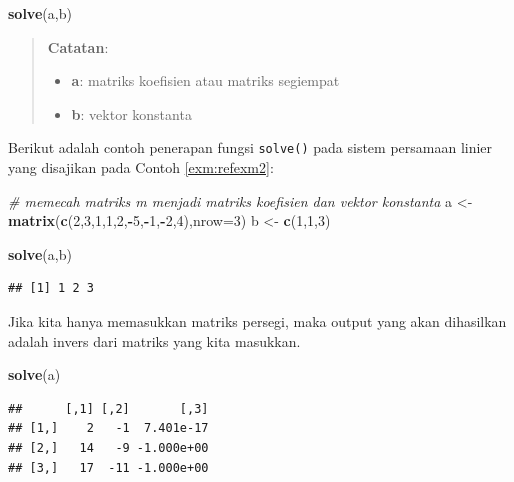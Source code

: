 \documentclass[]{book}
\newenvironment{Shaded}{\begin{snugshade}}{\end{snugshade}}
\newcommand{\CommentTok}[1]{\textcolor[rgb]{0.56,0.35,0.01}{\textit{#1}}}
\newcommand{\DataTypeTok}[1]{\textcolor[rgb]{0.13,0.29,0.53}{#1}}
\newcommand{\DecValTok}[1]{\textcolor[rgb]{0.00,0.00,0.81}{#1}}
\newcommand{\KeywordTok}[1]{\textcolor[rgb]{0.13,0.29,0.53}{\textbf{#1}}}
\newcommand{\NormalTok}[1]{#1}
\newcommand{\OperatorTok}[1]{\textcolor[rgb]{0.81,0.36,0.00}{\textbf{#1}}}
\newcommand{\StringTok}[1]{\textcolor[rgb]{0.31,0.60,0.02}{#1}}
\providecommand{\tightlist}{%
  \setlength{\itemsep}{0pt}\setlength{\parskip}{0pt}}
\theoremstyle{definition}
\theoremstyle{definition}
\theoremstyle{definition}
\theoremstyle{remark}
\begin{document}
\begin{Shaded}
\begin{Highlighting}[]
\KeywordTok{solve}\NormalTok{(a,b)}
\end{Highlighting}
\end{Shaded}

\begin{quote}
\textbf{Catatan}:

\begin{itemize}
\tightlist
\item
  \textbf{a}: matriks koefisien atau matriks segiempat
\item
  \textbf{b}: vektor konstanta
\end{itemize}
\end{quote}

Berikut adalah contoh penerapan fungsi \texttt{solve()} pada sistem persamaan linier yang disajikan pada Contoh \ref{exm:refexm2}:

\begin{Shaded}
\begin{Highlighting}[]
\CommentTok{# memecah matriks m menjadi matriks koefisien dan vektor konstanta}
\NormalTok{a <-}\StringTok{ }\KeywordTok{matrix}\NormalTok{(}\KeywordTok{c}\NormalTok{(}\DecValTok{2}\NormalTok{,}\DecValTok{3}\NormalTok{,}\DecValTok{1}\NormalTok{,}\DecValTok{1}\NormalTok{,}\DecValTok{2}\NormalTok{,}\OperatorTok{-}\DecValTok{5}\NormalTok{,}\OperatorTok{-}\DecValTok{1}\NormalTok{,}\OperatorTok{-}\DecValTok{2}\NormalTok{,}\DecValTok{4}\NormalTok{),}\DataTypeTok{nrow=}\DecValTok{3}\NormalTok{)}
\NormalTok{b <-}\StringTok{ }\KeywordTok{c}\NormalTok{(}\DecValTok{1}\NormalTok{,}\DecValTok{1}\NormalTok{,}\DecValTok{3}\NormalTok{)}

\KeywordTok{solve}\NormalTok{(a,b)}
\end{Highlighting}
\end{Shaded}

\begin{verbatim}
## [1] 1 2 3
\end{verbatim}

Jika kita hanya memasukkan matriks persegi, maka output yang akan dihasilkan adalah invers dari matriks yang kita masukkan.

\begin{Shaded}
\begin{Highlighting}[]
\KeywordTok{solve}\NormalTok{(a)}
\end{Highlighting}
\end{Shaded}

\begin{verbatim}
##      [,1] [,2]       [,3]
## [1,]    2   -1  7.401e-17
## [2,]   14   -9 -1.000e+00
## [3,]   17  -11 -1.000e+00
\end{verbatim}
\end{document}
